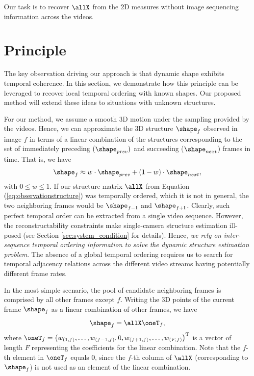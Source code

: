 Our task is to recover  $\allX$ from the 2D measures without image sequencing information across the videos.



\section{Principle} \label{sec:principle}
The key observation driving our approach is that dynamic shape exhibits temporal coherence. In this section, we demonstrate how this principle can be leveraged to recover local temporal ordering with known shapes. Our proposed method will extend these ideas to situations with unknown structures.

For our method, we assume a smooth 3D motion under the sampling provided by the videos.
Hence, we can approximate the 3D structure  $\shape_f$ observed in image $f$ in terms of a linear combination of the structures corresponding to the set of immediately preceding ($\shape_{prev})$ and succeeding ($\shape_{next}$) frames in time.
That is, we have
\begin{equation}
\shape_f \approx w \cdot \shape_{prev} + (1-w) \cdot \shape_{next},
\label{eq:linear_comb_2}
\end{equation}
with $0 \leq w \leq 1$.
If our structure matrix $\allX$ from Equation (\ref{eq:observationstructure}) was temporally ordered, which it is not in general, the two neighboring frames would be $\shape_{f-1}$ and $\shape_{f+1}$.
Clearly, such perfect temporal order can be extracted from a single video sequence. However, the reconstructability constraints 
make single-camera structure estimation ill-posed (see Section \ref{sec:system_condition} for details). Hence, \textit{we rely on inter-sequence temporal ordering information to solve the dynamic structure estimation problem}. The absence of a global temporal ordering requires us to search for temporal adjacency relations across the different video streams having potentially different frame rates. 

In the most simple scenario, the pool of candidate neighboring frames is comprised by all other frames except $f$.
Writing the 3D points of the current frame $\shape_f$ as a linear combination of other frames, we have
\begin{equation}
\shape_f = \allX  \oneT_f,
\end{equation}
where $\oneT_f=\left(w_{(1,f)}, \dotsc, w_{(f-1,f)}, 0, w_{(f+1,f)}, \dotsc, w_{(F,f)}\right)^\text{T}$
is a vector of length $F$ representing the coefficients for the linear combination.
Note that the $f$-th element in $\oneT_f$ equals 0, since the $f$-th column of $\allX$ (corresponding to $\shape_f$) is not used as an element of the linear combination. 

